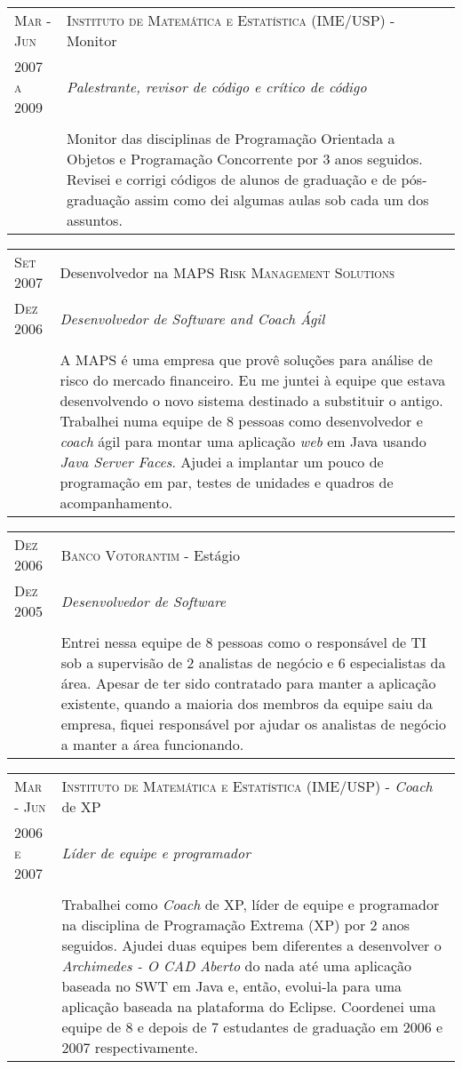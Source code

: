 \documentclass[letter,10pt]{article}
\begin{document}
\begin{tabular}{p{2.5cm}|p{13.5cm}}
  \textsc{Mar - Jun} & \textsc{Instituto de Matemática e Estatística
    (IME/USP)} - Monitor\\
  \textsc{2007 a 2009}& \emph{Palestrante, revisor de código e crítico
    de código}\\
  &\\
  &Monitor das disciplinas de Programação Orientada a Objetos e
  Programação Concorrente por 3 anos seguidos. Revisei e corrigi
  códigos de alunos de graduação e de pós-graduação assim como dei
  algumas aulas sob cada um dos assuntos.
\end{tabular}


\begin{tabular}{p{2.5cm}|p{13.5cm}}
  \textsc{Set 2007} & Desenvolvedor na \textsc{MAPS Risk
    Management Solutions} \\
  \textsc{Dez 2006} &\emph{Desenvolvedor de Software and Coach Ágil}\\
  &\\
  & A MAPS é uma empresa que provê soluções para análise de risco do
  mercado financeiro. Eu me juntei à equipe que estava desenvolvendo o
  novo sistema destinado a substituir o antigo. Trabalhei numa equipe
  de 8 pessoas como desenvolvedor e \textit{coach} ágil para montar
  uma aplicação \textit{web} em Java usando \textit{Java Server
    Faces}. Ajudei a implantar um pouco de programação em par, testes
  de unidades e quadros de acompanhamento.
\end{tabular}

\begin{tabular}{p{2.5cm}|p{13.5cm}}
  \textsc{Dez 2006} & \textsc{Banco Votorantim} - Estágio\\
  \textsc{Dez 2005} &\emph{Desenvolvedor de Software}\\
  &\\
  &Entrei nessa equipe de 8 pessoas como o responsável de TI sob a
  supervisão de 2 analistas de negócio e 6 especialistas da área. Apesar de
  ter sido contratado para manter a aplicação existente, quando a
  maioria dos membros da equipe saiu da empresa, fiquei responsável
  por ajudar os analistas de negócio a manter a área funcionando.
\end{tabular}

\begin{tabular}{p{2.5cm}|p{13.5cm}}
  \textsc{Mar - Jun} & \textsc{Instituto de Matemática e Estatística
    (IME/USP)} - \textit{Coach} de XP\\
  \textsc{2006 e 2007}& \emph{Líder de equipe e programador}\\
  &\\
  &  Trabalhei como \textit{Coach} de XP, líder de equipe e
  programador na disciplina de Programação Extrema (XP) por 2 anos
  seguidos. Ajudei duas equipes bem diferentes a desenvolver o
  \emph{Archimedes - O CAD Aberto}  do nada até uma aplicação baseada
  no SWT em Java e, então, evolui-la para uma aplicação baseada na
  plataforma do Eclipse. Coordenei uma equipe de 8 e depois de 7
  estudantes de graduação em 2006 e 2007 respectivamente.
\end{tabular}
\end{document}
